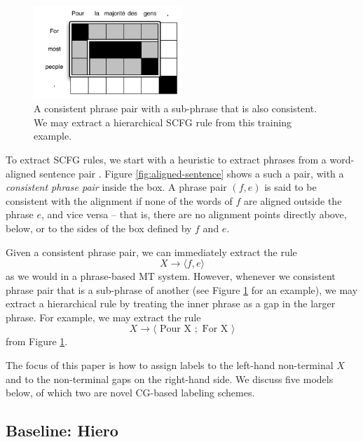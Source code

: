 \documentclass{article}
\begin{document}
\begin{figure}[t]
\includegraphics[width=0.5\textwidth]{../wmt11/figures/hierarchical-rule}
\caption{A consistent phrase pair with a sub-phrase that is also consistent. We may extract a hierarchical SCFG rule from this training example.\label{fig:hierarchical-phrases}}
\end{figure}

To extract SCFG rules, we start with a heuristic to extract phrases from a word-aligned sentence pair \cite{tillmann-2003}. Figure \ref{fig:aligned-sentence} shows a such a pair, with a {\em consistent phrase pair} inside the box. A phrase pair $(f,e)$ is said to be consistent with the alignment if none of the words of $f$ are aligned outside the phrase $e$, and vice versa -- that is, there are no alignment points directly above, below, or to the sides of the box defined by $f$ and $e$.

Given a consistent phrase pair, we can immediately extract the rule
\begin{equation}
X \to \langle f , e \rangle
\end{equation}
as we would in a phrase-based MT system. However, whenever we consistent phrase pair that is a sub-phrase of another (see Figure \ref{fig:hierarchical-phrases} for an example), we may extract a hierarchical rule by treating the inner phrase as a gap in the larger phrase. For example, we may extract the rule
\begin{equation}
X \to \langle \textrm{ Pour X }; \textrm{ For X } \rangle
\label{eqn:hiero-rule}
\end{equation}
from Figure \ref{fig:hierarchical-phrases}.

The focus of this paper is how to assign labels to the left-hand non-terminal $X$ and to the non-terminal gaps on the right-hand side. We discuss five models below, of which two are novel CG-based labeling schemes.

\subsection{Baseline: Hiero}
\end{document}

